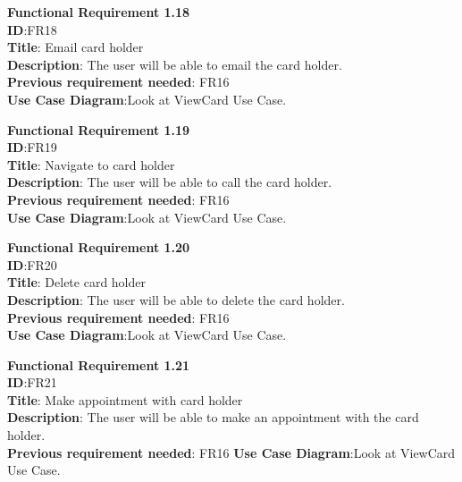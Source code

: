 \documentclass[english]{article}
\begin{document}
				\textbf{Functional Requirement 1.18}\\
				\textbf{ID}:FR18\\
				\textbf{Title}: Email card holder\\
				\textbf{Description}: The user will be able to email the card holder.\\
				\textbf{Previous requirement needed}: FR16\\
				\textbf{Use Case Diagram}:Look at ViewCard Use Case.
				
				\textbf{Functional Requirement 1.19}\\
				\textbf{ID}:FR19\\
				\textbf{Title}: Navigate to card holder\\
				\textbf{Description}: The user will be able to call the card holder.\\
				\textbf{Previous requirement needed}: FR16\\
				\textbf{Use Case Diagram}:Look at ViewCard Use Case.
				
				\textbf{Functional Requirement 1.20}\\
				\textbf{ID}:FR20\\
				\textbf{Title}: Delete card holder\\
				\textbf{Description}: The user will be able to delete the card holder.\\
				\textbf{Previous requirement needed}: FR16\\
				\textbf{Use Case Diagram}:Look at ViewCard Use Case.
				
				\textbf{Functional Requirement 1.21}\\
				\textbf{ID}:FR21\\
				\textbf{Title}: Make appointment with card holder\\
				\textbf{Description}: The user will be able to make an appointment with the card holder.\\
				\textbf{Previous requirement needed}: FR16\newpage
				\textbf{Use Case Diagram}:Look at ViewCard Use Case.
\end{document}
